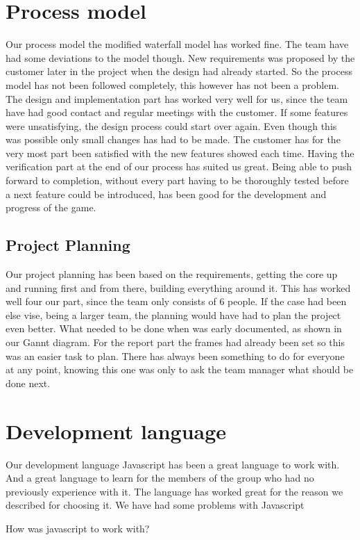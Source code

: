 \section{Process model}
Our process model the modified waterfall model has worked fine. The team have had some  deviations to the model though. New requirements was proposed by the customer later in the project when the design had already started. So the process model has not been followed completely, this however has not been a problem. The design  and implementation part has worked very well for us, since the team have had good contact and regular meetings with the customer. If some features were unsatisfying, the design process could start over again. Even though this was possible only small changes has had to be made. The customer has for the very most part been satisfied with the new features showed each time. Having the verification part at the end of our process has suited us great. Being able to push forward to completion, without every part having to be thoroughly tested before a next feature could be introduced, has been good for the development and progress of the game. 
\subsection{Project Planning}
Our project planning has been based on the requirements, getting the core up and running first and from there, building everything around it. This has worked well four our part, since the team only consists of 6 people. If the case had been else vise, being a larger team, the planning would have had to plan the project even better. What needed to be done when was early documented, as shown in our Gannt diagram. For the report part the frames had already been set so this was an easier task to plan. There has always been something to do for everyone at any point, knowing this one was only to ask the team manager what should be done next.


\section{Development language}
Our development language Javascript has been a great language to work with. And a great language to learn for the members of the group who had no previously experience with it. The language has worked great for the reason we described for choosing it. We have had some problems with Javascript 

How was javascript to work with?


